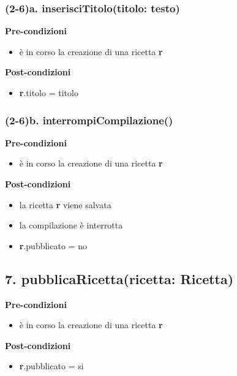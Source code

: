 \subsubsection*{(2-6)a. inserisciTitolo(titolo: testo)}

\textbf{Pre-condizioni}
\begin{itemize}
  \item è in corso la creazione di una ricetta  \textbf{r}
\end{itemize}
\textbf{Post-condizioni}
\begin{itemize}
  \item \textbf{r}.titolo = titolo
\end{itemize}

\subsubsection*{(2-6)b. interrompiCompilazione()}

\textbf{Pre-condizioni}
\begin{itemize}
  \item è in corso la creazione di una ricetta  \textbf{r}
\end{itemize}
\textbf{Post-condizioni}
\begin{itemize}
  \item la ricetta  \textbf{r} viene salvata
  \item la compilazione è interrotta
  \item \textbf{r}.pubblicato = no
\end{itemize}

\subsection*{7. pubblicaRicetta(ricetta: Ricetta)}

\textbf{Pre-condizioni}
\begin{itemize}
  \item è in corso la creazione di una ricetta  \textbf{r}
\end{itemize}
\textbf{Post-condizioni}
\begin{itemize}
  \item \textbf{r}.pubblicato = si
\end{itemize}


